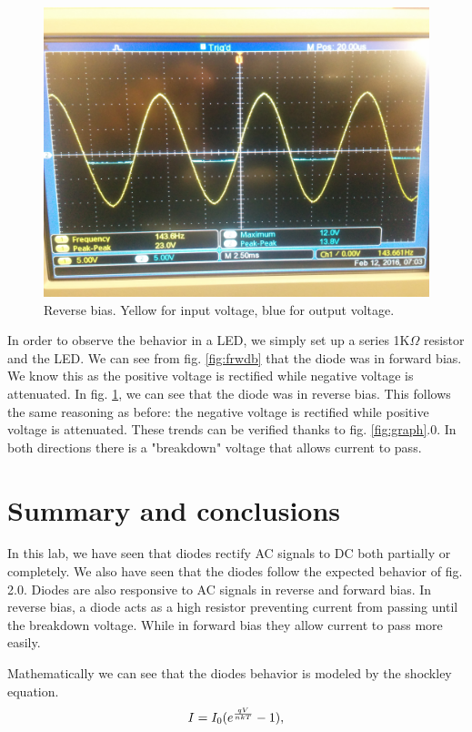 \documentclass[11pt,letterpaper,onecolumn]{article}
\begin{document}
\begin{figure}[H]
    \centering
    \includegraphics[scale =.1]{Reversebias.jpg}
    \caption{Reverse bias. Yellow for input voltage, blue for output voltage.}
    \label{fig:rvrsb}
\end{figure}

In order to observe the behavior in a LED, we simply set up a series 1K$\Omega$ resistor and the LED. We can see from fig. \ref{fig:frwdb} that the diode was in forward bias. We know this as the positive voltage is rectified while negative voltage is attenuated. In fig. \ref{fig:rvrsb}, we can see that the diode was in reverse bias. This follows the same reasoning as before: the negative voltage is rectified while positive voltage is attenuated. These trends can be verified thanks to fig. \ref{fig:graph}.0. In both directions there is a "breakdown" voltage that allows current to pass.  

\section{Summary and conclusions}

In this lab, we have seen that diodes rectify AC signals to DC both partially or completely. We also have seen that the diodes follow the expected behavior of fig. 2.0. Diodes are also responsive to AC signals in reverse and forward bias. In reverse bias, a diode acts as a high resistor preventing current from passing until the breakdown voltage. While in forward bias they allow current to pass more easily.  

Mathematically we can see that the diodes behavior is modeled by the shockley equation.
{\Large$$I = I_0(e^\frac{qV}{nkT}-1){\normalsize,}$$}
\end{document}
